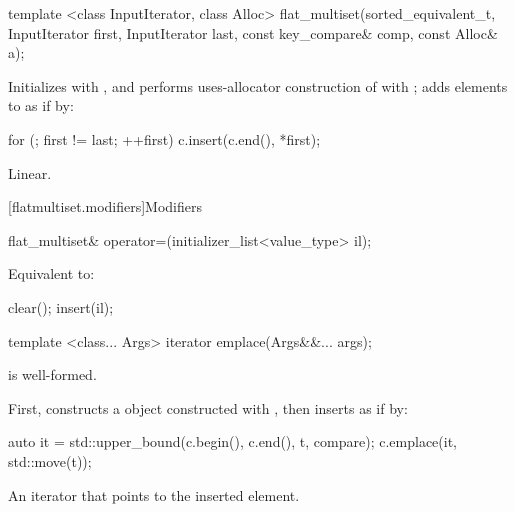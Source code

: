 \begin{codeblock}
\begin{codeblock}
\begin{codeblock}
\begin{addedblock}
%
\begin{itemdecl}
template <class InputIterator, class Alloc>
  flat_multiset(sorted_equivalent_t, InputIterator first, InputIterator last,
                const key_compare& comp, const Alloc& a);
\end{itemdecl}

\begin{itemdescr}
\pnum
\effects Initializes  with , and performs
uses-allocator construction of 
with ; adds elements to  as if by:
\begin{codeblock}
for (; first != last; ++first) {
  c.insert(c.end(), *first);
}
\end{codeblock}

\pnum
\complexity
Linear.
\end{itemdescr}

[flatmultiset.modifiers]{Modifiers}

%
\begin{itemdecl}
flat_multiset& operator=(initializer_list<value_type> il);
\end{itemdecl}

\begin{itemdescr}
\pnum
\effects Equivalent to:
\begin{codeblock}
clear();
insert(il);
\end{codeblock}
\end{itemdescr}

%
\begin{itemdecl}
template <class... Args> iterator emplace(Args&&... args);
\end{itemdecl}

\begin{itemdescr}
\pnum \constraints {} is well-formed.

\pnum
\effects
First, constructs a  object  constructed
with , then inserts  as if by:
\begin{codeblock}
auto it = std::upper_bound(c.begin(), c.end(), t, compare);
c.emplace(it, std::move(t));
\end{codeblock}

\pnum
\returns
An iterator that points to the inserted element.
\end{itemdescr}


\end{addedblock}
\end{codeblock}
\end{codeblock}
\end{codeblock}
